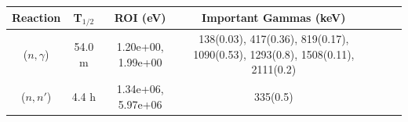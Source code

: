 \begin{table}[h]
\centering
\begin{tabular}{ |c|c|c|c|c|c|c| }
 \hline
 Reaction & T$_{1/2}$ & ROI (eV) & Important Gammas (keV) \\
 \hline 
 ($n,\gamma$) & 54.0 m & 1.20e+00, 1.99e+00 & 138(0.03), 417(0.36), 819(0.17), 1090(0.53), 1293(0.8), 1508(0.11), 2111(0.2) \\ 
\hline
 ($n,n'$) &  4.4 h & 1.34e+06, 5.97e+06 & 335(0.5) \\ 
\hline
\end{tabular}
\end{table}
